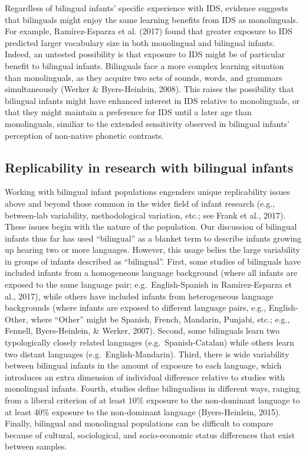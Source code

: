 \documentclass[,man,floatsintext]{apa6}
\begin{document}
Regardless of bilingual infants' specific experience with IDS, evidence suggests that bilinguals might enjoy the same learning benefits from IDS as monolinguals. For example, Ramírez-Esparza et al. (2017) found that greater exposure to IDS predicted larger vocabulary size in both monolingual and bilingual infants. Indeed, an untested possibility is that exposure to IDS might be of particular benefit to bilingual infants. Bilinguals face a more complex learning situation than monolinguals, as they acquire two sets of sounds, words, and grammars simultaneously (Werker \& Byers-Heinlein, 2008). This raises the possibility that bilingual infants might have enhanced interest in IDS relative to monolinguals, or that they might maintain a preference for IDS until a later age than monolinguals, similiar to the extended sensitivity observed in bilingual infants' perception of non-native phonetic contrasts.

\hypertarget{replicability-in-research-with-bilingual-infants}{%
\subsection{Replicability in research with bilingual infants}\label{replicability-in-research-with-bilingual-infants}}

Working with bilingual infant populations engenders unique replicability issues above and beyond those common in the wider field of infant research (e.g., between-lab variability, methodological variation, etc.; see Frank et al., 2017). These issues begin with the nature of the population. Our discussion of bilingual infants thus far has used \enquote{bilingual} as a blanket term to describe infants growing up hearing two or more languages. However, this usage belies the large variability in groups of infants described as \enquote{bilingual}. First, some studies of bilinguals have included infants from a homogeneous language background (where all infants are exposed to the same language pair; e.g.~English-Spanish in Ramírez-Esparza et al., 2017), while others have included infants from heterogeneous language backgrounds (where infants are exposed to different language pairs, e.g., English-Other, where ``Other'' might be Spanish, French, Mandarin, Punjabi, etc.; e.g., Fennell, Byers-Heinlein, \& Werker, 2007). Second, some bilinguals learn two typologically closely related languages (e.g.~Spanish-Catalan) while others learn two distant languages (e.g.~English-Mandarin). Third, there is wide variability between bilingual infants in the amount of exposure to each language, which introduces an extra dimension of individual difference relative to studies with monolingual infants. Fourth, studies define bilingualism in different ways, ranging from a liberal criterion of at least 10\% exposure to the non-dominant language to at least 40\% exposure to the non-dominant language (Byers-Heinlein, 2015). Finally, bilingual and monolingual populations can be difficult to compare because of cultural, sociological, and socio-economic status differences that exist between samples.
\end{document}
